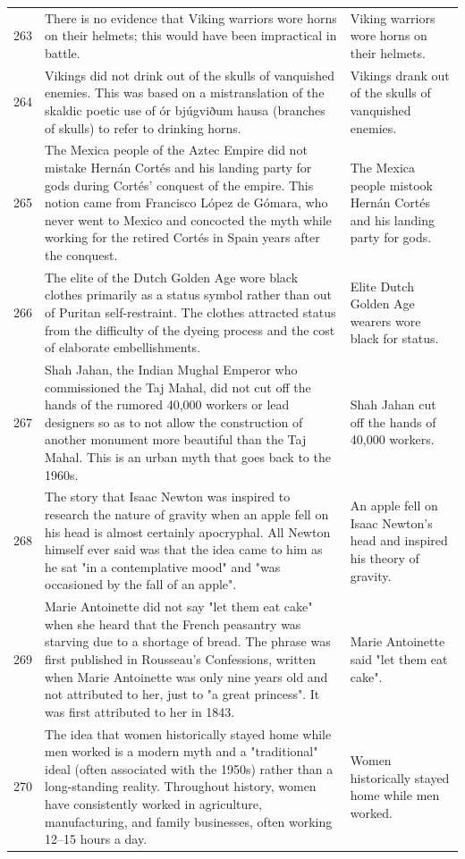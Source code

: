 \begin{tabular}{c|p{}|p{}}
263 & There is no evidence that Viking warriors wore horns on their helmets; this would have been impractical in battle. & Viking warriors wore horns on their helmets. \\
264 & Vikings did not drink out of the skulls of vanquished enemies. This was based on a mistranslation of the skaldic poetic use of ór bjúgviðum hausa (branches of skulls) to refer to drinking horns. & Vikings drank out of the skulls of vanquished enemies. \\
265 & The Mexica people of the Aztec Empire did not mistake Hernán Cortés and his landing party for gods during Cortés' conquest of the empire. This notion came from Francisco López de Gómara, who never went to Mexico and concocted the myth while working for the retired Cortés in Spain years after the conquest. & The Mexica people mistook Hernán Cortés and his landing party for gods. \\
266 & The elite of the Dutch Golden Age wore black clothes primarily as a status symbol rather than out of Puritan self-restraint. The clothes attracted status from the difficulty of the dyeing process and the cost of elaborate embellishments. & Elite Dutch Golden Age wearers wore black for status. \\
267 & Shah Jahan, the Indian Mughal Emperor who commissioned the Taj Mahal, did not cut off the hands of the rumored 40,000 workers or lead designers so as to not allow the construction of another monument more beautiful than the Taj Mahal. This is an urban myth that goes back to the 1960s. & Shah Jahan cut off the hands of 40,000 workers. \\
268 & The story that Isaac Newton was inspired to research the nature of gravity when an apple fell on his head is almost certainly apocryphal. All Newton himself ever said was that the idea came to him as he sat "in a contemplative mood" and "was occasioned by the fall of an apple". & An apple fell on Isaac Newton's head and inspired his theory of gravity. \\
269 & Marie Antoinette did not say "let them eat cake" when she heard that the French peasantry was starving due to a shortage of bread. The phrase was first published in Rousseau's Confessions, written when Marie Antoinette was only nine years old and not attributed to her, just to "a great princess". It was first attributed to her in 1843. & Marie Antoinette said "let them eat cake". \\
270 & The idea that women historically stayed home while men worked is a modern myth and a "traditional" ideal (often associated with the 1950s) rather than a long-standing reality. Throughout history, women have consistently worked in agriculture, manufacturing, and family businesses, often working 12–15 hours a day. & Women historically stayed home while men worked. \\

\end{tabular}
